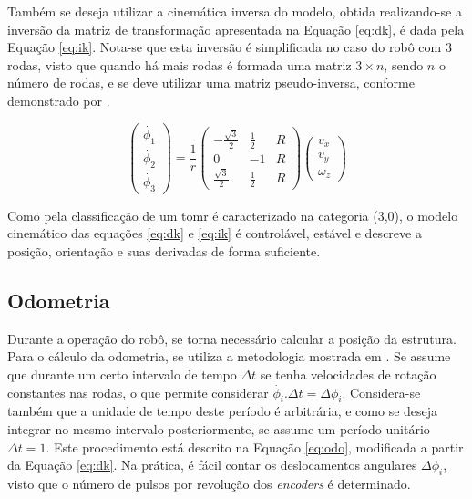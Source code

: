 Também se deseja utilizar a cinemática inversa do modelo, obtida realizando-se a inversão da matriz de transformação apresentada na Equação \ref{eq:dk}, é dada pela Equação \ref{eq:ik}. Nota-se que esta inversão é simplificada no caso do robô com 3 rodas, visto que quando há mais rodas é formada uma matriz $3 \times n$, sendo $n$ o número de rodas, e se deve utilizar uma matriz pseudo-inversa, conforme demonstrado por \citet{rojas2006holonomic}.

\begin{equation}
  \begin{pmatrix}
    \dot{\phi_1} \\
    \dot{\phi_2} \\
    \dot{\phi_3}
  \end{pmatrix}
  =
  \frac{1}{r}
  \begin{pmatrix}
    -\frac{\sqrt{3}}{2} & \frac{1}{2} & R \\
    0                   & -1          & R \\
    \frac{\sqrt{3}}{2}  & \frac{1}{2} & R
  \end{pmatrix}
  \begin{pmatrix}
    v_x \\
    v_y \\
    \omega_z
  \end{pmatrix}
  \label{eq:ik}
\end{equation}

Como pela classificação de \citet{campion1996structural} um \acrshort{tomr} é caracterizado na categoria (3,0), o modelo cinemático das equações \ref{eq:dk} e \ref{eq:ik} é controlável, estável e descreve a posição, orientação e suas derivadas de forma suficiente. %

\subsection{Odometria}

Durante a operação do robô, se torna necessário calcular a posição da estrutura. Para o cálculo da odometria, se utiliza a metodologia mostrada em \citet{lynch2017modern}. Se assume que durante um certo intervalo de tempo $\Delta t$ se tenha velocidades de rotação constantes nas rodas, o que permite considerar $\dot{\phi_i}.\Delta t = \Delta \phi_i$. Considera-se também que a unidade de tempo deste período é arbitrária, e como se deseja integrar no mesmo intervalo posteriormente, se assume um período unitário $\Delta t = 1$. Este procedimento está descrito na Equação \ref{eq:odo}, modificada a partir da Equação \ref{eq:dk}. Na prática, é fácil contar os deslocamentos angulares $\Delta \phi_i$, visto que o número de pulsos por revolução dos \textit{encoders} é determinado.

